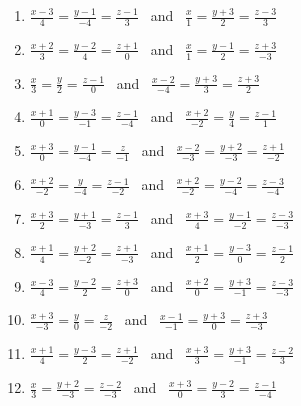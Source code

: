 \begin{enumerate}[label=\arabic*., leftmargin=*]
\item $\frac{x-3}{4}=\frac{y-1}{-4}=\frac{z-1}{3}$ \ and \ $\frac{x}{1}=\frac{y+3}{2}=\frac{z-3}{3}$
\item $\frac{x+2}{3}=\frac{y-2}{4}=\frac{z+1}{0}$ \ and \ $\frac{x}{1}=\frac{y-1}{2}=\frac{z+3}{-3}$
\item $\frac{x}{3}=\frac{y}{2}=\frac{z-1}{0}$ \ and \ $\frac{x-2}{-4}=\frac{y+3}{3}=\frac{z+3}{2}$
\item $\frac{x+1}{0}=\frac{y-3}{-1}=\frac{z-1}{-4}$ \ and \ $\frac{x+2}{-2}=\frac{y}{4}=\frac{z-1}{1}$
\item $\frac{x+3}{0}=\frac{y-1}{-4}=\frac{z}{-1}$ \ and \ $\frac{x-2}{-3}=\frac{y+2}{-3}=\frac{z+1}{-2}$
\item $\frac{x+2}{-2}=\frac{y}{-4}=\frac{z-1}{-2}$ \ and \ $\frac{x+2}{-2}=\frac{y-2}{-4}=\frac{z-3}{-4}$
\item $\frac{x+3}{2}=\frac{y+1}{-3}=\frac{z-1}{3}$ \ and \ $\frac{x+3}{4}=\frac{y-1}{-2}=\frac{z-3}{-3}$
\item $\frac{x+1}{4}=\frac{y+2}{-2}=\frac{z+1}{-3}$ \ and \ $\frac{x+1}{2}=\frac{y-3}{0}=\frac{z-1}{2}$
\item $\frac{x-3}{4}=\frac{y-2}{2}=\frac{z+3}{0}$ \ and \ $\frac{x+2}{0}=\frac{y+3}{-1}=\frac{z-3}{-3}$
\item $\frac{x+3}{-3}=\frac{y}{0}=\frac{z}{-2}$ \ and \ $\frac{x-1}{-1}=\frac{y+3}{0}=\frac{z+3}{-3}$
\item $\frac{x+1}{4}=\frac{y-3}{2}=\frac{z+1}{-2}$ \ and \ $\frac{x+3}{3}=\frac{y+3}{-1}=\frac{z-2}{3}$
\item $\frac{x}{3}=\frac{y+2}{-3}=\frac{z-2}{-3}$ \ and \ $\frac{x+3}{0}=\frac{y-2}{3}=\frac{z-1}{-4}$
\end{enumerate}

